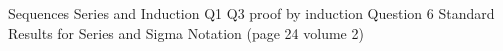 Sequences Series and Induction
Q1
Q3 proof by induction
Question 6
Standard Results for Series and Sigma Notation (page 24 volume 2)
